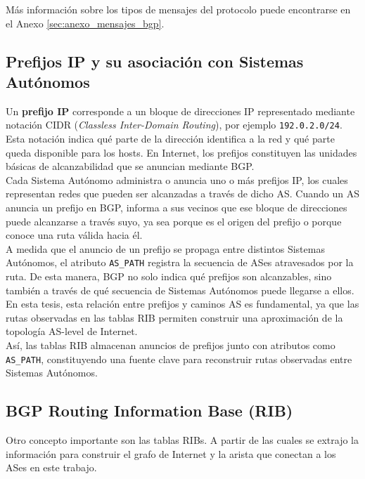 Más información sobre los tipos de mensajes del protocolo puede encontrarse en el Anexo \ref{sec:anexo_mensajes_bgp}.

\subsection{Prefijos IP y su asociación con Sistemas Autónomos}
Un \textbf{prefijo IP} corresponde a un bloque de direcciones IP representado mediante notación CIDR (\textit{Classless Inter-Domain Routing}), por ejemplo \texttt{192.0.2.0/24}. Esta notación indica qué parte de la dirección identifica a la red y qué parte queda disponible para los hosts. En Internet, los prefijos constituyen las unidades básicas de alcanzabilidad que se anuncian mediante BGP.\\

Cada Sistema Autónomo administra o anuncia uno o más prefijos IP, los cuales representan redes que pueden ser alcanzadas a través de dicho AS. Cuando un AS anuncia un prefijo en BGP, informa a sus vecinos que ese bloque de direcciones puede alcanzarse a través suyo, ya sea porque es el origen del prefijo o porque conoce una ruta válida hacia él.\\

A medida que el anuncio de un prefijo se propaga entre distintos Sistemas Autónomos, el atributo \texttt{AS\_PATH} registra la secuencia de ASes atravesados por la ruta. De esta manera, BGP no solo indica qué prefijos son alcanzables, sino también a través de qué secuencia de Sistemas Autónomos puede llegarse a ellos. En esta tesis, esta relación entre prefijos y caminos AS es fundamental, ya que las rutas observadas en las tablas RIB permiten construir una aproximación de la topología AS-level de Internet.\\

Así, las tablas RIB almacenan anuncios de prefijos junto con atributos como \texttt{AS\_PATH}, constituyendo una fuente clave para reconstruir rutas observadas entre Sistemas Autónomos.\\


\subsection{\textbf{BGP} Routing Information Base (RIB)}

Otro concepto importante son las tablas RIBs. A partir de las cuales se extrajo la información para construir el grafo de Internet y la arista que conectan a los ASes en este trabajo.\\

